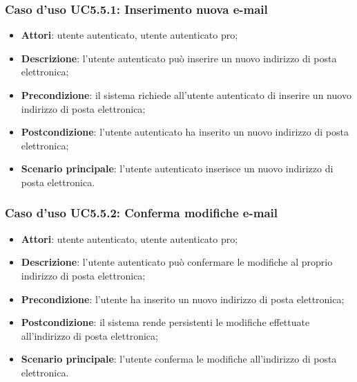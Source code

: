 \subsubsection{Caso d'uso UC5.5.1: Inserimento nuova e-mail}

\begin{itemize}
	\item \textbf{Attori}: utente autenticato, utente autenticato pro;
	\item \textbf{Descrizione}: l'utente autenticato può inserire un nuovo indirizzo di posta elettronica;
	\item \textbf{Precondizione}: il sistema richiede all'utente autenticato di inserire un nuovo indirizzo di posta elettronica;
	\item \textbf{Postcondizione}: l'utente autenticato ha inserito un nuovo indirizzo di posta elettronica;
	\item \textbf{Scenario principale}: l'utente autenticato inserisce un nuovo indirizzo di posta elettronica.
\end{itemize}

\subsubsection{Caso d'uso UC5.5.2: Conferma modifiche e-mail}

\begin{itemize}
	\item \textbf{Attori}: utente autenticato, utente autenticato pro;
	\item \textbf{Descrizione}: l'utente autenticato può confermare le modifiche al proprio indirizzo di posta elettronica;
	\item \textbf{Precondizione}: l'utente ha inserito un nuovo indirizzo di posta elettronica;
	\item \textbf{Postcondizione}: il sistema rende persistenti le modifiche effettuate all'indirizzo di posta elettronica;
	\item \textbf{Scenario principale}: l'utente conferma le modifiche all'indirizzo di posta elettronica.
\end{itemize}

